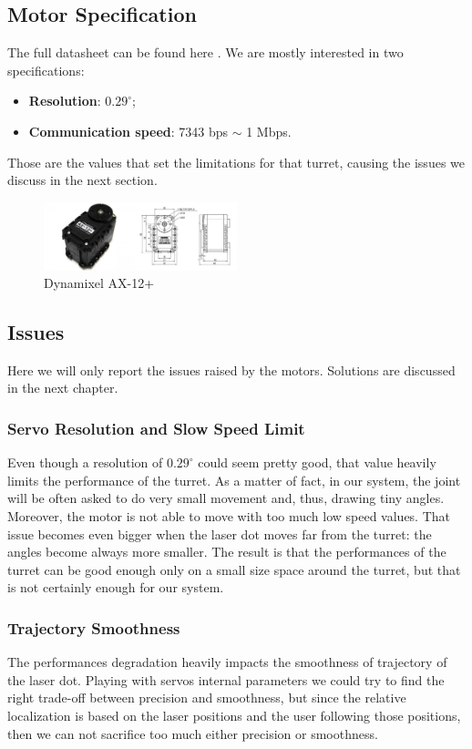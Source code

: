 \subsection{Motor Specification}
The full datasheet can be found here \cite{datasheet-AX-12}. We are mostly interested in two specifications: 
\begin{itemize}
    \item \textbf{Resolution}: $0.29^{\circ}$;
    \item \textbf{Communication speed}: 7343 bps $\sim$ 1 Mbps.
\end{itemize}
Those are the values that set the limitations for that turret, causing the issues we discuss in the next section.
\begin{figure}
	\centering
	\includegraphics[width=0.5\textwidth]{img/ax12+.png}%
	\caption{Dynamixel AX-12+}
	\label{fig:ax12+}
\end{figure}
\subsection{Issues}\label{subs:firstModel:issues}
Here we will only report the issues raised by the motors. Solutions are discussed in the next chapter.
\subsubsection{Servo Resolution and Slow Speed Limit}
Even though a resolution of $0.29^{\circ}$ could seem pretty good, that value heavily limits the performance of the turret. As a matter of fact, in our system, the joint will be often asked to do very small movement and, thus, drawing tiny angles. Moreover, the motor is not able to move with too much low speed values. That issue becomes even bigger when the laser dot moves far from the turret: the angles become always more smaller. The result is that the performances of the turret can be good enough only on a small size space around the turret, but that is not certainly enough for our system.
\subsubsection{Trajectory Smoothness}
The performances degradation heavily impacts the smoothness of trajectory of the laser dot. Playing with servos internal parameters we could try to find the right trade-off between precision and smoothness, but since the relative localization is based on the laser positions and the user following those positions, then we can not sacrifice too much either precision or smoothness.
